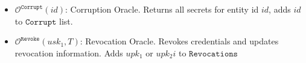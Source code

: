\begin{itemize}
    \item $\mathcal{O}^{\texttt{Corrupt}}(id)$: Corruption Oracle. Returns all secrets for entity id $id$, adds $id$ to $\texttt{Corrupt}$ list.

    \item $\mathcal{O}^{\texttt{Revoke}}(usk_1, T)$: Revocation Oracle. Revokes credentials and updates revocation information. Adds $upk_1$ or $upk_2i$ to $\texttt{Revocations}$
    
\end{itemize}
